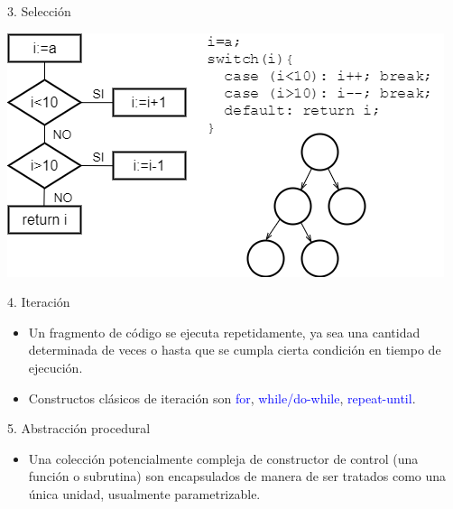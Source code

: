 \documentclass[handout]{beamer} %
\newcommand{\blue}[1]{\textcolor{blue}{#1}}
\begin{document}
\begin{frame}{3. Selección}
  \begin{center}
    \includegraphics[width=.9\textwidth]{./image/cap6/seleccion2}
  \end{center}
\end{frame}

\begin{frame}{4. Iteración}
  \begin{itemize}
    \item<1-> Un fragmento de código se ejecuta repetidamente, ya sea una cantidad determinada de veces o hasta que se cumpla cierta condición en tiempo de ejecución.
    \item<2-> Constructos clásicos de iteración son \blue{for}, \blue{while/do-while}, \blue{repeat-until}.
  \end{itemize}
\end{frame}

\begin{frame}{5. Abstracción procedural}
  \begin{itemize}
    \item Una colección potencialmente compleja de constructor de control (una función o subrutina) son encapsulados de manera de ser tratados como una única unidad, usualmente parametrizable.
  \end{itemize}
\end{frame}
\end{document}
